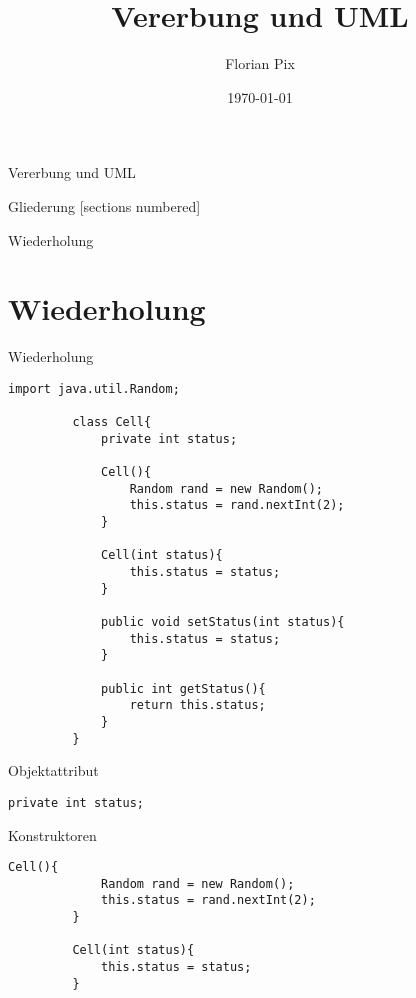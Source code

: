 \documentclass[10pt]{beamer}
\author{Florian Pix}
\institute{SWT Übung SoSe19}
\title{Vererbung und UML}
\date{\today}
\begin{document}
\begin{frame}{Vererbung und UML}
    \titlepage
\end{frame}

\begin{frame}{Gliederung}
    [sections numbered]
    \tableofcontents
\end{frame}

\begin{frame}[fragile]{Wiederholung}
    \section{Wiederholung}
\end{frame}

\begin{frame}[fragile]{Wiederholung}
    \begin{lstlisting}[basicstyle=\ttfamily\scriptsize,gobble=8]
         import java.util.Random;
         
         class Cell{
             private int status;
         
             Cell(){
                 Random rand = new Random();
                 this.status = rand.nextInt(2);
             }
         
             Cell(int status){  
                 this.status = status; 
             }
         
             public void setStatus(int status){  
                 this.status = status;
             }
         
             public int getStatus(){
                 return this.status;
             }
         }
    \end{lstlisting}
\end{frame}

\begin{frame}[fragile]{Objektattribut}
    \begin{lstlisting}[basicstyle=\ttfamily\scriptsize,gobble=8]
          private int status;
    \end{lstlisting}
\end{frame}

\begin{frame}[fragile]{Konstruktoren}
    \begin{lstlisting}[basicstyle=\ttfamily\scriptsize,gobble=8]
         Cell(){
             Random rand = new Random();
             this.status = rand.nextInt(2);
         }
     
         Cell(int status){  
             this.status = status; 
         }
    \end{lstlisting}
\end{frame}
\end{document}
